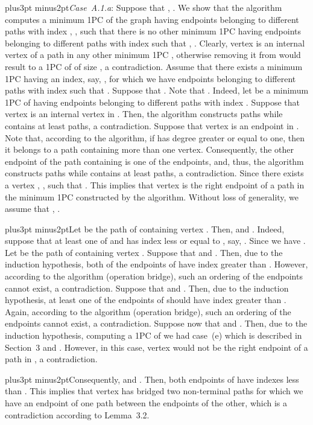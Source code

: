 \documentclass[10pt]{article}
\def\yskip{\penalty-50\vskip3pt plus3pt minus2pt}
\def\y{\yskip}
\begin{document}
{\y \textit{Case~A.1.a}: Suppose that , . We show that the
algorithm computes a minimum 1PC  of
the graph  having  endpoints 
belonging to different paths with index , , such that there is no other minimum 1PC
 having 
endpoints  belonging to different paths with index
 such that
, .
Clearly, vertex  is an internal vertex of a path in any other
minimum 1PC , otherwise removing it
from  would result to a 1PC of
 of size , a
contradiction. Assume that there exists a minimum 1PC
 having an index, say, , for
which we have  endpoints 
belonging to different paths with index  such
that . Suppose
that . Note
that . Indeed, let
 be a minimum 1PC of  having
 endpoints
 belonging to different paths with index . Suppose that vertex  is an internal vertex in
. Then, the algorithm constructs
 paths while 
contains at least  paths, a contradiction.
Suppose that vertex  is an endpoint in
. Note that, according to the
algorithm, if  has degree greater or equal to one, then it
belongs to a path containing more than one vertex. Consequently,
the other endpoint of the path containing  is one of the
 endpoints, and, thus, the algorithm
constructs  paths while
 contains at least
 paths, a contradiction. Since
 there exists a
vertex , , such that . This implies that vertex  is the
right endpoint of a path  in the minimum 1PC
 constructed by the algorithm.
Without loss of generality, we assume that , .

\y Let  be the path of
 containing vertex . Then,
 and . Indeed, suppose that at least one of 
and  has index less or equal to , say, . Since
 we have . Let  be the path of
 containing vertex . Suppose
that  and . Then, due to the induction
hypothesis, both of the endpoints of  have index greater than
. However, according to the algorithm (operation bridge),
such an ordering of the endpoints cannot exist, a contradiction.
Suppose that  and . Then, due to the
induction hypothesis, at least one of the endpoints of  should
have index greater than . Again, according to the algorithm
(operation bridge), such an ordering of the endpoints cannot
exist, a contradiction. Suppose now that  and
. Then, due to the induction hypothesis, computing a
1PC of  we had case~(e) which is described in Section~3 and
. However, in this case, vertex  would not
be the right endpoint of a path in
, a contradiction.

\y Consequently,  and . Then, both endpoints of 
have indexes less than . This implies that vertex  has
bridged two non-terminal paths for which we have an endpoint of
one path between the endpoints of the other, which is a
contradiction according to Lemma~3.2.

}
\end{document}
